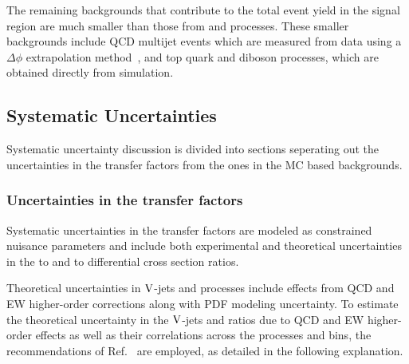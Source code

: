 The remaining backgrounds that contribute to the total event yield in the signal region
are much smaller than those from \Zvvjets and \Wlvjets processes. These smaller backgrounds
include QCD multijet events which are measured from data using a $\Delta\phi$ extrapolation
method~\cite{Collaboration:2011ida,paper-exo-037}, and top quark and diboson processes, which are
obtained directly from simulation.

\newpage

\subsection{Systematic Uncertainties}

Systematic uncertainty discussion is divided into sections seperating out the
uncertainties in the transfer factors from the ones in the MC based backgrounds.

\subsubsection{Uncertainties in the transfer factors}

Systematic uncertainties in the transfer factors are
modeled as constrained nuisance parameters and include both
experimental and theoretical uncertainties
in the \phojets to \Zjets and \Wjets to \Zjets differential cross section ratios.

Theoretical uncertainties in $\mathrm{V}$-jets and \phojets processes include effects from QCD and EW higher-order
corrections along with PDF modeling uncertainty. To estimate the theoretical uncertainty
in the $\mathrm{V}$-jets and \phojets ratios due to QCD and EW higher-order effects as well as their correlations across
the processes and \pt bins, the recommendations of Ref.~\cite{DMTheory} are employed,
as detailed in the following explanation.

